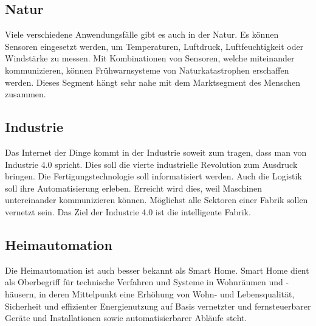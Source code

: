 \subsection{Natur}
Viele verschiedene Anwendungsfälle gibt es auch in der Natur. Es können Sensoren eingesetzt werden, um Temperaturen, Luftdruck, Luftfeuchtigkeit oder Windstärke zu messen. Mit Kombinationen von Sensoren, welche miteinander kommunizieren, können Frühwarnsysteme von Naturkatastrophen erschaffen werden. Dieses Segment hängt sehr nahe mit dem Marktsegment des Menschen zusammen.
\subsection{Industrie}
Das Internet der Dinge kommt in der Industrie soweit zum tragen, dass man von Industrie 4.0 spricht. Dies soll die vierte industrielle Revolution zum Ausdruck bringen. Die Fertigungstechnologie soll informatisiert werden. Auch die Logistik soll ihre Automatisierung erleben. Erreicht wird dies, weil Maschinen untereinander kommunizieren können. Möglichst alle Sektoren einer Fabrik sollen vernetzt sein. Das Ziel der Industrie 4.0 ist die intelligente Fabrik.

\subsection{Heimautomation}
Die Heimautomation ist auch besser bekannt als Smart Home. Smart Home dient als Oberbegriff für technische Verfahren und Systeme in Wohnräumen und -häusern, in deren Mittelpunkt eine Erhöhung von Wohn- und Lebensqualität, Sicherheit und effizienter Energienutzung auf Basis vernetzter und fernsteuerbarer Geräte und Installationen sowie automatisierbarer Abläufe steht.

